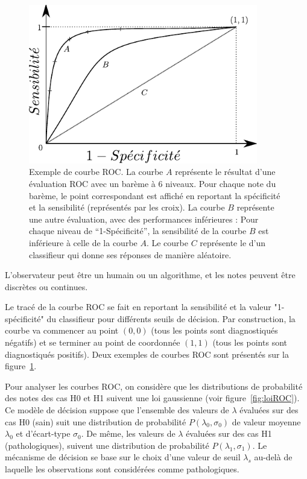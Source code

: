 \begin{figure}[h]
	\begin{center}
	\includegraphics[width=10cm]{images/illustrationROC}
	\end{center}
	\caption[Exemple de courbe ROC]{Exemple de courbe ROC. La courbe $A$ représente le résultat d'une évaluation ROC avec un barème à 6 niveaux. Pour chaque note du barème, le point correspondant est affiché en reportant la spécificité et la sensibilité (représentés par les croix). La courbe $B$ représente une autre évaluation, avec des performances inférieures : Pour chaque niveau de ``1-Spécificité'', la sensibilité de la courbe $B$ est inférieure à celle de la courbe $A$. Le courbe $C$ représente le d'un classifieur qui donne ses réponses de manière aléatoire.}
	\label{fig:illustrationROC}
\end{figure}

L'observateur peut être un humain ou un algorithme, et les notes peuvent être discrètes ou continues. 

Le tracé de la courbe ROC se fait en reportant la sensibilité et la valeur "1-spécificité" du classifieur pour différents seuils de décision. Par construction, la courbe va commencer au point $(0,0)$ (tous les points sont diagnostiqués négatifs) et se terminer au point de coordonnée $(1,1)$ (tous les points sont diagnostiqués positifs). Deux exemples de courbes ROC sont présentés sur la figure~\ref{fig:illustrationROC}.


Pour analyser les courbes ROC, on considère que les distributions de probabilité des notes des cas H0 et H1 suivent une loi gaussienne (voir figure~\ref{fig:loiROC}). Ce modèle de décision suppose que l'ensemble des valeurs de $\lambda$ évaluées sur des cas H0 (sain) suit une distribution de probabilité $P(\lambda_0, \sigma_0)$ de valeur moyenne $\lambda_0$ et d'écart-type $\sigma_0$. De même, les valeurs de $\lambda$ évaluées sur des cas H1 (pathologiques), suivent une distribution de probabilité $P(\lambda_1, \sigma_1)$. Le mécanisme de décision se base sur le choix d'une valeur de seuil $\lambda_s$ au-delà de laquelle les observations sont considérées comme pathologiques.

